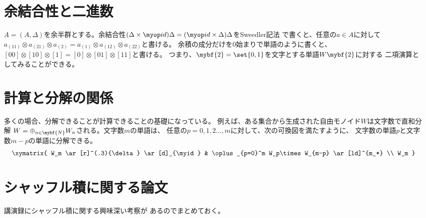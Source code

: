 \section{余結合性と二進数}\label{s1:結合性と二進数} %
	$A=(A,\Delta)$を余半群とする。余結合性$
	(\Delta\times \myid)\Delta=(\myid\times \Delta)\Delta$をSweedler記法
	で書くと、任意の$a\in A$に対して$a_{(11)}\otimes a_{(21)}\otimes a_{(2)}
	=a_{(1)}\otimes a_{(12)}\otimes a_{(22)}$と書ける。
	余積の成分だけを$0$始まりで単語のように書くと、
	$[00]\otimes[10]\otimes[1]=[0]\otimes[01]\otimes[11]$と書ける。
	つまり、$\mybf{2}=\set{0,1}$を文字とする単語$W\mybf{2}$に対する
	二項演算としてみることができる。

\section{計算と分解の関係}\label{s1:計算と分解の関係} %
	多くの場合、分解できることが計算できることの基礎になっている。
	例えば、ある集合から生成された自由モノイド$W$は文字数で直和分解
	$W=\oplus_{n\in\mybf{N}}W_n$される。文字数$m$の単語は、
	任意の$p=0,1,2\dots,m$に対して、次の可換図を満たすように、
	文字数の単語$p$と文字数$m-p$の単語に分解できる。
	\begin{equation*}\xymatrix{
		W_m \ar[r]^(.3){\delta} \ar[d]_{\myid} 
		& \oplus_{p=0}^m W_p\times W_{m-p} \ar[ld]^{m_*} \\
		W_m
	}\end{equation*}

\section{シャッフル積に関する論文}\label{s1:シャッフル積に関する論文} %
	講演録\cite{url:dotsenko:anick}にシャッフル積に関する興味深い考察が
	あるのでまとめておく。

	\begin{todo}[問題設定がわからない]\label{todo:問題設定がわからない} %
	\end{todo} %

